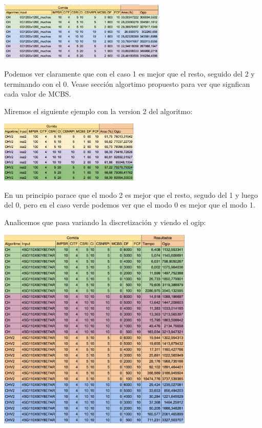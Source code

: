 \begin{center}
\includegraphics[width=0.6\textwidth]{imagenes/tabla19}
\end{center}


Podemos ver claramente que con el caso 1 es mejor que el resto, seguido del 2 y terminando con el 0. Vease secci\'on algortimo propuesto para ver que signfican cada valor de MCBS.


Miremos el siguiente ejemplo con la version 2 del algoritmo:

\begin{center}
\includegraphics[width=0.5\textwidth]{imagenes/tabla20}
\end{center}

En un principio parace que el modo 2 es mejor que el resto, segudo del 1 y luego del 0, pero en el caso verde podemos ver que el modo 0 es mejor que el modo 1.

\newpage

Analicemos que pasa variando la discretizaci\'on y viendo el ogip:


\begin{center}
\includegraphics[width=0.7\textwidth]{imagenes/tabla21}
\end{center}

